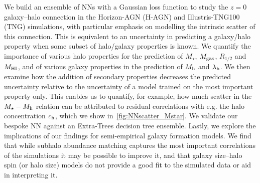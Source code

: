 \documentclass[usenatbib,useAMS]{mnras}
\begin{document}
We build an ensemble of \aclp{NN} with a Gaussian loss function to study the $z=0$ galaxy--halo connection in the Horizon-AGN (H-AGN) and Illustris-TNG100 (TNG) simulations, with particular emphasis on modelling the intrinsic scatter of this connection. This is equivalent to an uncertainty in predicting a galaxy/halo property when some subset of halo/galaxy properties is known. We quantify the importance of various halo properties for the prediction of $M_\star$, $M_{\rm gas}$, $R_{1/2}$ and $M_{\rm HI}$, and of various galaxy properties in the prediction of $M_{\rm h}$ and $\lambda_{\rm h}$. We then examine how the addition of secondary properties decreases the predicted uncertainty relative to the uncertainty of a model trained on the most important property only. This enables us to quantify, for example, how much scatter in the $M_\star - M_{\rm h}$ relation can be attributed to residual correlations with e.g. the halo concentration $c_{\rm h}$, which we show in~\cref{fig:NNscatter_Mstar}. We validate our bespoke \acl{NN} against an Extra-Trees decision tree ensemble. Lastly, we explore the implications of our findings for semi-empirical galaxy formation models. We find that while subhalo abundance matching captures the most important correlations of the simulations it may be possible to improve it, and that galaxy size--halo spin (or halo size) models do not provide a good fit to the simulated data or aid in interpreting it.
\end{document}
